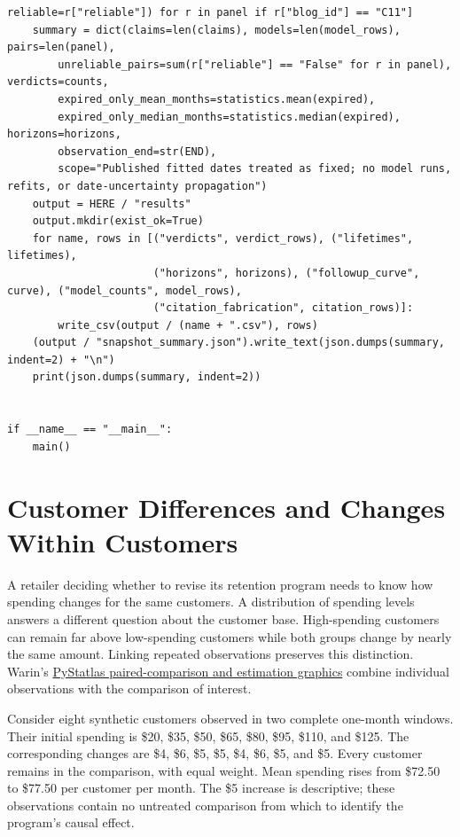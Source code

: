 \begin{Verbatim}[breaklines,breakanywhere,fontsize=\small]
        reliable=r["reliable"]) for r in panel if r["blog_id"] == "C11"]
    summary = dict(claims=len(claims), models=len(model_rows), pairs=len(panel),
        unreliable_pairs=sum(r["reliable"] == "False" for r in panel), verdicts=counts,
        expired_only_mean_months=statistics.mean(expired),
        expired_only_median_months=statistics.median(expired), horizons=horizons,
        observation_end=str(END),
        scope="Published fitted dates treated as fixed; no model runs, refits, or date-uncertainty propagation")
    output = HERE / "results"
    output.mkdir(exist_ok=True)
    for name, rows in [("verdicts", verdict_rows), ("lifetimes", lifetimes),
                       ("horizons", horizons), ("followup_curve", curve), ("model_counts", model_rows),
                       ("citation_fabrication", citation_rows)]:
        write_csv(output / (name + ".csv"), rows)
    (output / "snapshot_summary.json").write_text(json.dumps(summary, indent=2) + "\n")
    print(json.dumps(summary, indent=2))


if __name__ == "__main__":
    main()
\end{Verbatim}

\hypertarget{M02-customer-differences-and-changes-within-customers}{%
\section{Customer Differences and Changes Within
Customers}\label{M02-customer-differences-and-changes-within-customers}}

\noindent \noindent A retailer deciding whether to revise its retention program
needs to know how spending changes for the same customers. A
distribution of spending levels answers a different question about the
customer base. High-spending customers can remain far above low-spending
customers while both groups change by nearly the same amount. Linking
repeated observations preserves this distinction. Warin's
\href{https://warint.github.io/pystatlas/group-comparisons/}{PyStatlas
paired-comparison and estimation graphics} combine individual
observations with the comparison of interest.

Consider eight synthetic customers observed in two complete one-month
windows. Their initial spending is \$20, \$35, \$50, \$65, \$80, \$95,
\$110, and \$125. The corresponding changes are \$4, \$6, \$5, \$5, \$4,
\$6, \$5, and \$5. Every customer remains in the comparison, with equal
weight. Mean spending rises from \$72.50 to \$77.50 per customer per
month. The \$5 increase is descriptive; these observations contain no
untreated comparison from which to identify the program's causal effect.


